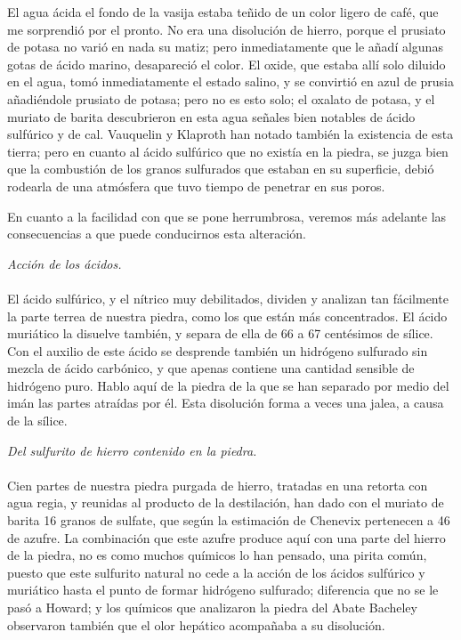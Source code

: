 \documentclass[a4paper, 12pt, oneside, spanish]{article}
\begin{document}
El agua ácida el fondo de la vasija estaba teñido de un color ligero de café, que me sorprendió por el pronto. No era una disolución de hierro, porque el prusiato de potasa no varió en nada su matiz; pero inmediatamente que le añadí algunas gotas de ácido marino, desapareció el color. El oxide, que estaba allí solo diluido en el agua, tomó inmediatamente el estado salino, y se convirtió en azul de prusia añadiéndole prusiato de potasa; pero no es esto solo; el oxalato de potasa, y el muriato de barita descubrieron en esta agua señales bien notables de ácido sulfúrico y de cal. Vauquelin y Klaproth han notado también la existencia de esta tierra; pero en cuanto al ácido sulfúrico que no existía en la piedra, se juzga bien que la combustión de los granos sulfurados que estaban en su superficie, debió rodearla de una atmósfera que tuvo tiempo de penetrar en sus poros.

En cuanto a la facilidad con que se pone herrumbrosa, veremos más adelante las consecuencias a que puede conducirnos esta alteración.
\begin{center}
\emph{Acción de los ácidos.}
\end{center}
\paragraph{}
El ácido sulfúrico, y el nítrico muy debilitados, dividen y analizan tan fácilmente la parte terrea de nuestra piedra, como los que están más concentrados. El ácido muriático la disuelve también, y separa de ella de 66 a 67 centésimos de sílice. Con el auxilio de este ácido se desprende también un hidrógeno sulfurado sin mezcla de ácido carbónico, y que apenas contiene una cantidad sensible de hidrógeno puro. Hablo aquí de la piedra de la que se han separado por medio del imán las partes atraídas por él. Esta disolución forma a veces una jalea, a causa de la sílice.
\begin{center}
\emph{Del sulfurito de hierro contenido en la piedra.}
\end{center}
\paragraph{}
Cien partes de nuestra piedra purgada de hierro, tratadas en una retorta con agua regia, y reunidas al producto de la destilación, han dado con el muriato de barita 16 granos de sulfate, que según la estimación de Chenevix pertenecen a 46 de azufre. La combinación que este azufre produce aquí con una parte del hierro de la piedra, no es como muchos químicos lo han pensado, una pirita común, puesto que este sulfurito natural no cede a la acción de los ácidos sulfúrico y muriático hasta el punto de formar hidrógeno sulfurado; diferencia que no se le pasó a Howard; y los químicos que analizaron la piedra del Abate Bacheley observaron también que el olor hepático acompañaba a su disolución.
\end{document}
